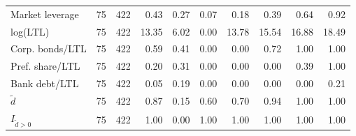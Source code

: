 \begin{threeparttable}
\begin{tabular}{lrrrrrrrrr}
Market leverage & 75 & 422 & 0.43 & 0.27 & 0.07 & 0.18 & 0.39 & 0.64 & 0.92 \\
log(LTL) & 75 & 422 & 13.35 & 6.02 & 0.00 & 13.78 & 15.54 & 16.88 & 18.49 \\
Corp. bonds/LTL & 75 & 422 & 0.59 & 0.41 & 0.00 & 0.00 & 0.72 & 1.00 & 1.00 \\
Pref. share/LTL & 75 & 422 & 0.20 & 0.31 & 0.00 & 0.00 & 0.00 & 0.39 & 1.00 \\
Bank debt/LTL & 75 & 422 & 0.05 & 0.19 & 0.00 & 0.00 & 0.00 & 0.00 & 0.21 \\
\ensuremath{\tilde{d}} & 75 & 422 & 0.87 & 0.15 & 0.60 & 0.70 & 0.94 & 1.00 & 1.00 \\
\ensuremath{I_{\tilde{d}>0}} & 75 & 422 & 1.00 & 0.00 & 1.00 & 1.00 & 1.00 & 1.00 & 1.00 \\
\bottomrule\end{tabular}\end{threeparttable}
